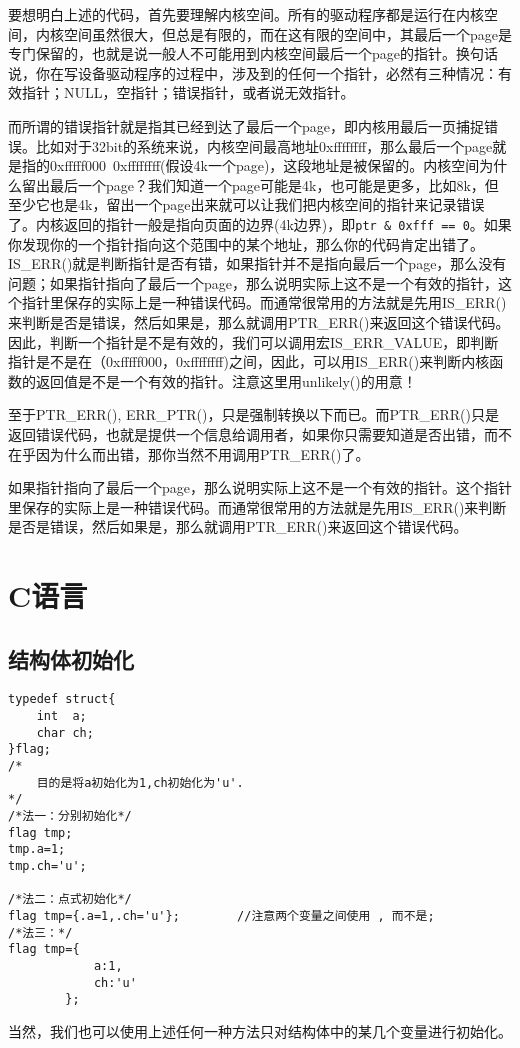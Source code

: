 				要想明白上述的代码，首先要理解内核空间。所有的驱动程序都是运行在内核空间，内核空间虽然很大，但总是有限的，而在这有限的空间中，其最后一个page是专门保留的，也就是说一般人不可能用到内核空间最后一个page的指针。换句话说，你在写设备驱动程序的过程中，涉及到的任何一个指针，必然有三种情况：有效指针；NULL，空指针；错误指针，或者说无效指针。

				而所谓的错误指针就是指其已经到达了最后一个page，即内核用最后一页捕捉错误。比如对于32bit的系统来说，内核空间最高地址0xffffffff，那么最后一个page就是指的0xfffff000~0xffffffff(假设4k一个page)，这段地址是被保留的。内核空间为什么留出最后一个page？我们知道一个page可能是4k，也可能是更多，比如8k，但至少它也是4k，留出一个page出来就可以让我们把内核空间的指针来记录错误了。内核返回的指针一般是指向页面的边界(4k边界)，即\texttt{ptr & 0xfff == 0}。如果你发现你的一个指针指向这个范围中的某个地址，那么你的代码肯定出错了。IS\_ERR()就是判断指针是否有错，如果指针并不是指向最后一个page，那么没有问题；如果指针指向了最后一个page，那么说明实际上这不是一个有效的指针，这个指针里保存的实际上是一种错误代码。而通常很常用的方法就是先用IS\_ERR()来判断是否是错误，然后如果是，那么就调用PTR\_ERR()来返回这个错误代码。因此，判断一个指针是不是有效的，我们可以调用宏IS\_ERR\_VALUE，即判断指针是不是在（0xfffff000，0xffffffff)之间，因此，可以用IS\_ERR()来判断内核函数的返回值是不是一个有效的指针。注意这里用unlikely()的用意！

				至于PTR\_ERR(), ERR\_PTR()，只是强制转换以下而已。而PTR\_ERR()只是返回错误代码，也就是提供一个信息给调用者，如果你只需要知道是否出错，而不在乎因为什么而出错，那你当然不用调用PTR\_ERR()了。

				如果指针指向了最后一个page，那么说明实际上这不是一个有效的指针。这个指针里保存的实际上是一种错误代码。而通常很常用的方法就是先用IS\_ERR()来判断是否是错误，然后如果是，那么就调用PTR\_ERR()来返回这个错误代码。
	
	\section{C语言}
		\subsection{结构体初始化}
\begin{verbatim}
typedef struct{
	int  a;
	char ch;
}flag;
/*
	目的是将a初始化为1,ch初始化为'u'.
*/
/*法一：分别初始化*/
flag tmp;
tmp.a=1;
tmp.ch='u';

/*法二：点式初始化*/
flag tmp={.a=1,.ch='u'};		//注意两个变量之间使用 , 而不是;
/*法三：*/
flag tmp={
			a:1,
			ch:'u'
		};
\end{verbatim}
			当然，我们也可以使用上述任何一种方法只对结构体中的某几个变量进行初始化。


